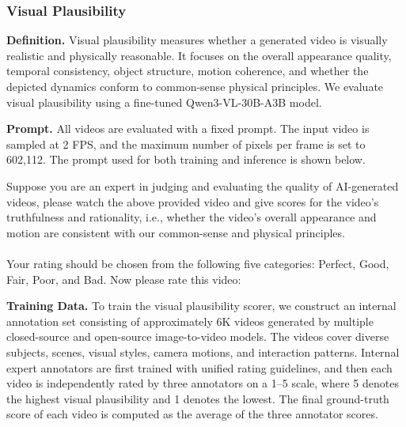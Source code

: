 \documentclass{llmxive}
\providecommand{\myparagraph}[1]{\vspace{-0.1em}\noindent\textbf{#1}\hspace{0.3em}}
\begin{document}
\subsubsection{Visual Plausibility}
\label{app:visual_plausibility_detail}

\myparagraph{Definition.}
Visual plausibility measures whether a generated video is visually realistic and physically reasonable. It focuses on the overall appearance quality, temporal consistency, object structure, motion coherence, and whether the depicted dynamics conform to common-sense physical principles. We evaluate visual plausibility using a fine-tuned Qwen3-VL-30B-A3B model.

\myparagraph{Prompt.}
All videos are evaluated with a fixed prompt. The input video is sampled at 2 FPS, and the maximum number of pixels per frame is set to 602,112. The prompt used for both training and inference is shown below.

\begin{tcolorbox}[d5box, title={Visual Plausibility --- Fine-tuned Qwen3-VL-30B-A3B}]
\ttfamily\scriptsize
Suppose you are an expert in judging and evaluating the quality of AI-generated videos, please watch the above provided video and give scores for the video's truthfulness and rationality, i.e., whether the video's overall appearance and motion are consistent with our common-sense and physical principles.\\
\\
Your rating should be chosen from the following five categories: Perfect, Good, Fair, Poor, and Bad. Now please rate this video:
\end{tcolorbox}

\myparagraph{Training Data.}
To train the visual plausibility scorer, we construct an internal annotation set consisting of approximately 6K videos generated by multiple closed-source and open-source image-to-video models. The videos cover diverse subjects, scenes, visual styles, camera motions, and interaction patterns. Internal expert annotators are first trained with unified rating guidelines, and then each video is independently rated by three annotators on a 1--5 scale, where 5 denotes the highest visual plausibility and 1 denotes the lowest. The final ground-truth score of each video is computed as the average of the three annotator scores.
\end{document}
